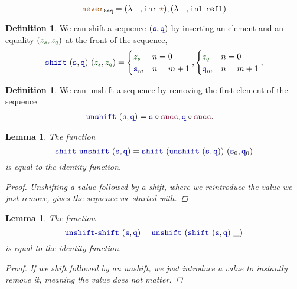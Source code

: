 \documentclass[twoside,11pt,openright]{report}
\theoremstyle{plain} %
\newtheorem{lem}[thm]{Lemma}
\theoremstyle{definition}
\newtheorem{defn}[thm]{Definition}%
\theoremstyle{remark}
\newcommand*{\term}[1]{\textcolor{green!30!black}{#1}} %
\newcommand*{\constant}[1]{\textcolor{orange!60!black}{\ensuremath{\mathtt{#1}}}}
\newcommand*{\function}[1]{\textcolor{blue!60!black}{\ensuremath{\mathtt{#1}}}}
\newcommand*{\constructor}[1]{\textcolor{purple!60!black}{\ensuremath{\mathtt{#1}}}}
\newcommand*{\typeformer}[1]{\ensuremath{\mathtt{#1}}}
\newcommand*{\unitelem}{\constant{\star}} %
\begin{document}
\begin{equation}
  \constant{never}_{\typeformer{Seq}} = (\lambda\,\_, \mathtt{inr}~\unitelem) , (\lambda\,\_, \mathtt{inl}~\mathtt{refl})
\end{equation}
\begin{defn}
  We can shift a sequence \((\function{s},\function{q})\) by inserting an element and an equality \((\term{z_s},\term{z_q})\) at the front of the sequence,
  \begin{equation}
    \function{shift}~(\function{s} , \function{q})~(\term{z_s} , \term{z_q}) = \begin{cases} \term{z_s} & n = 0 \\ \function{s}_m & n = m + 1 \end{cases} , \begin{cases} \term{z_q} & n = 0\\ \function{q}_m & n = m + 1 \end{cases},
  \end{equation}
\end{defn}
\begin{defn}
  We can unshift a sequence by removing the first element of the sequence
  \begin{equation}
    \begin{aligned}
      \function{unshift}&~(\function{s} , \function{q}) = \function{s} \circ \constructor{succ} , \function{q} \circ \constructor{succ}.
    \end{aligned}
  \end{equation}
\end{defn}
\begin{lem}
  The function
  \begin{equation}
    \function{shift\text{-}unshift}~(\function{s},\function{q}) = \function{shift}~(\function{unshift}~(\function{s},\function{q}))~(\function{s}_0,\function{q}_0)
  \end{equation}
  is equal to the identity function.
  \begin{proof}
    Unshifting a value followed by a shift, where we reintroduce the value we just remove, gives the sequence we started  with.
  \end{proof}
\end{lem}
\begin{lem}
  The function
  \begin{equation}
    \function{unshift\text{-}shift}~(\function{s},\function{q})=\function{unshift}~(\function{shift}~(\function{s},\function{q})~\_)
  \end{equation}
  is equal to the identity function.
  \begin{proof}
    If we shift followed by an unshift, we just introduce a value to instantly remove it, meaning the value does not matter.
  \end{proof}
\end{lem}
\end{document}
